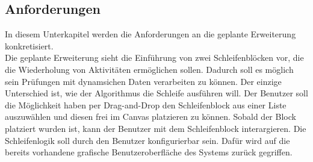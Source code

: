    \subsection{Anforderungen}
    \label{Anforderungen}
    In diesem Unterkapitel werden die Anforderungen an die geplante Erweiterung konkretisiert.
    \\
    Die geplante Erweiterung sieht die Einführung von zwei Schleifenblöcken vor, die die Wiederholung von Aktivitäten ermöglichen sollen. 
    Dadurch soll es möglich sein Prüfungen mit dynamsichen Daten verarbeiten zu können.
    Der einzige Unterschied ist, wie der Algorithmus die Schleife ausführen will.
    Der Benutzer soll die Möglichkeit haben per Drag-and-Drop den Schleifenblock aus einer Liste auszuwählen und diesen frei im Canvas platzieren zu können.
    Sobald der Block platziert wurden ist, kann der Benutzer mit dem Schleifenblock interargieren.
    Die Schleifenlogik soll durch den Benutzer konfigurierbar sein. 
    Dafür wird auf die bereits vorhandene grafische Benutzeroberfläche des Systems zurück gegriffen.
